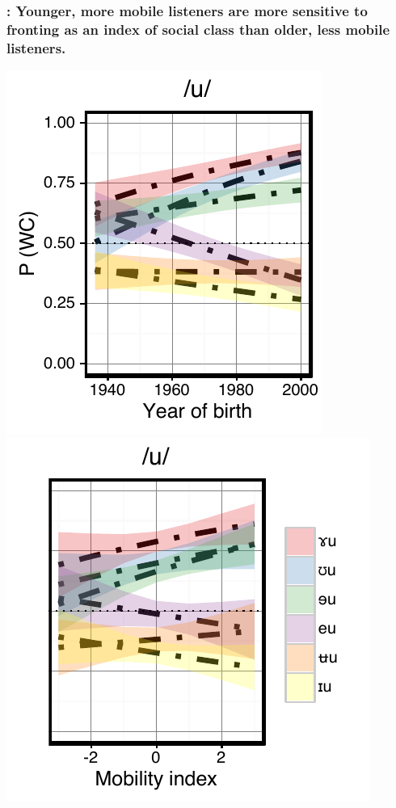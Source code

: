 \documentclass[a0,portrait]{a0poster}
\begin{document}
\begin{multicols}{3}
\subsubsection*{: Younger, more mobile listeners are more sensitive to fronting as an index of social class than older, less mobile listeners.}
\hspace*{-1cm}
\includegraphics[scale=2]{u_perception_age_sd.pdf}
\includegraphics[scale=2]{u_perception_dim3_sd.pdf}
\vspace*{-1.5cm}

\end{multicols}
\end{document}
